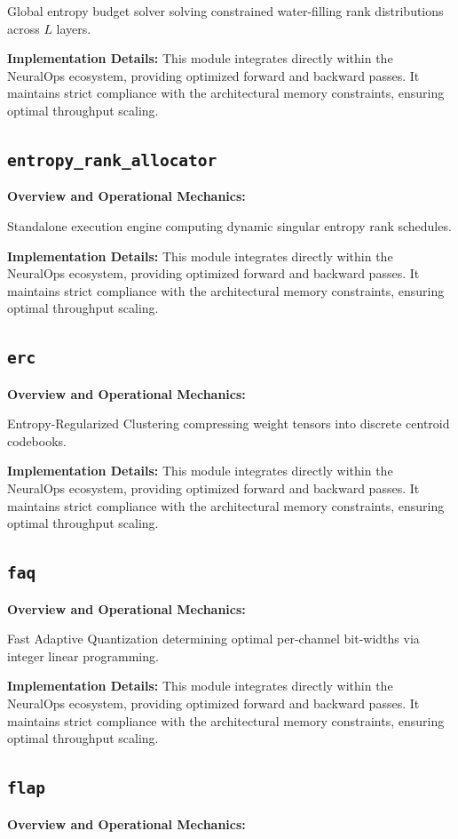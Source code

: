 \documentclass[10pt,twocolumn,letterpaper]{article}
\begin{document}
Global entropy budget solver solving constrained water-filling rank distributions across $L$ layers.

\textbf{Implementation Details:}
This module integrates directly within the NeuralOps ecosystem, providing optimized forward and backward passes. It maintains strict compliance with the architectural memory constraints, ensuring optimal throughput scaling.

\subsection{\texttt{entropy\_rank\_allocator}}
\textbf{Overview and Operational Mechanics:}

Standalone execution engine computing dynamic singular entropy rank schedules.

\textbf{Implementation Details:}
This module integrates directly within the NeuralOps ecosystem, providing optimized forward and backward passes. It maintains strict compliance with the architectural memory constraints, ensuring optimal throughput scaling.

\subsection{\texttt{erc}}
\textbf{Overview and Operational Mechanics:}

Entropy-Regularized Clustering compressing weight tensors into discrete centroid codebooks.

\textbf{Implementation Details:}
This module integrates directly within the NeuralOps ecosystem, providing optimized forward and backward passes. It maintains strict compliance with the architectural memory constraints, ensuring optimal throughput scaling.

\subsection{\texttt{faq}}
\textbf{Overview and Operational Mechanics:}

Fast Adaptive Quantization determining optimal per-channel bit-widths via integer linear programming.

\textbf{Implementation Details:}
This module integrates directly within the NeuralOps ecosystem, providing optimized forward and backward passes. It maintains strict compliance with the architectural memory constraints, ensuring optimal throughput scaling.

\subsection{\texttt{flap}}
\textbf{Overview and Operational Mechanics:}
\end{document}
